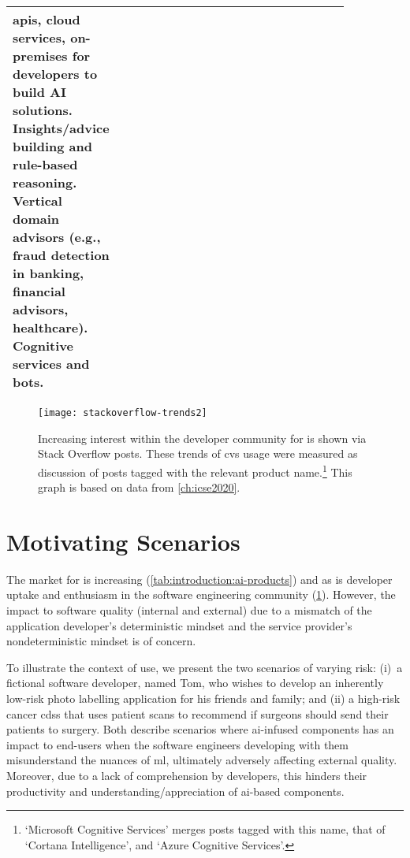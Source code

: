 \begin{landscape}
\begin{table}
{\begin{tabular}{p{0.2\linewidth}|p{0.25\linewidth}p{0.4\linewidth}}
\glspl{api}, cloud services, on-premises for developers to build AI solutions. Insights/advice building and rule-based reasoning. Vertical domain advisors (e.g., fraud detection in banking, financial advisors, healthcare). Cognitive services and bots.\\

\bottomrule

\end{tabular}}
\end{table}\end{landscape}

\begin{figure}[h!]
\centering
\texttt{[image: stackoverflow-trends2]}
\caption[Increasing interest in the developer community of computer vision services]{Increasing interest within the developer community for  is shown via Stack Overflow posts. These trends of \gls{cvs} usage were measured as discussion of posts tagged with the relevant product name.\footnote{`Microsoft Cognitive Services' merges posts tagged with this name, that of `Cortana Intelligence', and `Azure Cognitive Services'.} This graph is based on data from \cref{ch:icse2020}.}
\label{fig:introduction:stackoverflow-trends}
\end{figure}

\section{Motivating Scenarios}
\label{ssec:introduction:motivation}

The market for  is increasing (\cref{tab:introduction:ai-products}) and as is developer uptake and enthusiasm in the software engineering community (\cref{fig:introduction:stackoverflow-trends}). However, the impact to software quality (internal and external) due to a mismatch of the application developer's deterministic  mindset and the service provider's nondeterministic mindset is of concern.

To illustrate the context of use, we present the two scenarios of varying risk: (i)~a fictional software developer, named Tom, who wishes to develop an inherently low-risk photo labelling application for his friends and family; and (ii) a high-risk cancer \gls{cdss} that uses patient scans to recommend if surgeons should send their patients to surgery. Both describe scenarios where \gls{ai}-infused components has an impact to end-users when the software engineers developing with them misunderstand the nuances of \gls{ml}, ultimately adversely affecting external quality. Moreover, due to a lack of comprehension by developers, this hinders their productivity and understanding/appreciation of \gls{ai}-based components.
  
